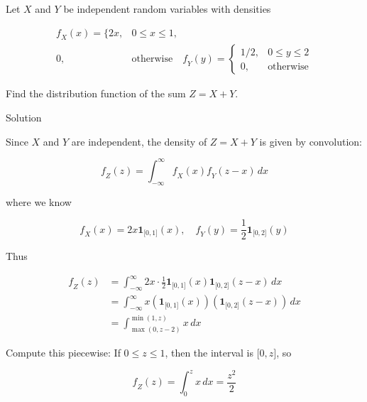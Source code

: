 Let \(\mathit{X}\) and \(\mathit{Y}\) be independent random variables with densities

\[\begin{matrix}
{\mathit{f}_{\mathit{X}}(\mathit{x}) = \{ 2\mathit{x},} & {0 \leq \mathit{x} \leq 1,} \\
{0,} & {\text{otherwise}\quad\mathit{f}_{\mathit{Y}}(\mathit{y}) = \left\{ \begin{matrix}
{1/2,} & {0 \leq \mathit{y} \leq 2} \\
{0,} & \text{otherwise}
\end{matrix} \right.}
\end{matrix}\]

Find the distribution function of the sum \(\mathit{Z} = \mathit{X} + \mathit{Y}\).

\begin{qlsolution}{Solution}

Since \(\mathit{X}\) and \(\mathit{Y}\) are independent, the density of \(\mathit{Z} = \mathit{X} + \mathit{Y}\) is given by convolution:

\[\mathit{f}_{\mathit{Z}}(\mathit{z}) = \int_{- \infty}^{\infty}\mathit{f}_{\mathit{X}}(\mathit{x})\mathit{f}_{\mathit{Y}}(\mathit{z} - \mathit{x})\,\mathit{d}\mathit{x}\]

where we know

\[\mathit{f}_{\mathit{X}}(\mathit{x}) = 2\mathit{x}\mathbf{1}_{\lbrack 0,1\rbrack}(\mathit{x}),\quad\mathit{f}_{\mathit{Y}}(\mathit{y}) = \frac{1}{2}\mathbf{1}_{\lbrack 0,2\rbrack}(\mathit{y})\]

Thus

\[\begin{matrix}
{\mathit{f}_{\mathit{Z}}(\mathit{z})} & {= \int_{- \infty}^{\infty}2\mathit{x} \cdot \frac{1}{2}\mathbf{1}_{\lbrack 0,1\rbrack}(\mathit{x})\mathbf{1}_{\lbrack 0,2\rbrack}(\mathit{z} - \mathit{x})\,\mathit{d}\mathit{x}} \\
 & {= \int_{- \infty}^{\infty}\mathit{x}(\mathbf{1}_{\lbrack 0,1\rbrack}(\mathit{x}))(\mathbf{1}_{\lbrack 0,2\rbrack}(\mathit{z} - \mathit{x}))\,\mathit{d}\mathit{x}} \\
 & {= \int_{\max(0,\mathit{z} - 2)}^{\min(1,\mathit{z})}\mathit{x}\,\mathit{d}\mathit{x}}
\end{matrix}\]

Compute this piecewise: If \(0 \leq \mathit{z} \leq 1\), then the interval is \(\lbrack 0,\mathit{z}\rbrack\), so

\[\mathit{f}_{\mathit{Z}}(\mathit{z}) = \int_{0}^{\mathit{z}}\mathit{x}\,\mathit{d}\mathit{x} = \frac{\mathit{z}^{2}}{2}\]


\end{qlsolution}
